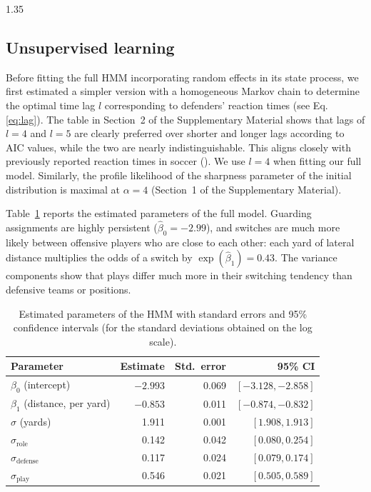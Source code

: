 \documentclass[12pt,a4paper]{article}
\begin{document}
\begin{spacing}{1.35}
\subsection{Unsupervised learning}
Before fitting the full HMM incorporating random effects in its state process, we first estimated a simpler version with a homogeneous Markov chain to determine the optimal time lag $l$ corresponding to defenders’ reaction times (see Eq. \ref{eq:lag}). The table in Section~2 of the Supplementary Material shows that lags of $l = 4$ and $l = 5$ are clearly preferred over shorter and longer lags according to AIC values, while the two are nearly indistinguishable. This aligns closely with previously reported reaction times in soccer (\citealp{wu2023evaluation}). We use $l = 4$ when fitting our full model. Similarly, the profile likelihood of the sharpness parameter of the initial distribution is maximal at $\alpha = 4$ (Section~1 of the Supplementary Material).

Table~\ref{tab:fixed} reports the estimated parameters of the full model. Guarding assignments are highly persistent ($\hat\beta_0 = -2.99$), and switches are much more likely between offensive players who are close to each other: each yard of lateral distance multiplies the odds of a switch by $\exp(\hat\beta_1) = 0.43$. The variance components show that plays differ much more in their switching tendency than defensive teams or positions.

\begin{table}[t!]
\centering
\caption{Estimated parameters of the HMM with standard errors and 95\% confidence intervals (for the standard deviations obtained on the log scale).}
\label{tab:fixed}
\begin{tabular}{lrrr}
\hline
Parameter & Estimate & Std.\ error & 95\% CI \\
\hline
$\beta_0$ (intercept) & $-2.993$ & 0.069 & $[-3.128, -2.858]$ \\
$\beta_1$ (distance, per yard) & $-0.853$ & 0.011 & $[-0.874, -0.832]$ \\
$\sigma$ (yards) & 1.911 & 0.001 & $[1.908, 1.913]$ \\
$\sigma_{\text{role}}$ & 0.142 & 0.042 & $[0.080, 0.254]$ \\
$\sigma_{\text{defense}}$ & 0.117 & 0.024 & $[0.079, 0.174]$ \\
$\sigma_{\text{play}}$ & 0.546 & 0.021 & $[0.505, 0.589]$ \\
\hline
\end{tabular}
\end{table}


\end{spacing}
\end{document}
